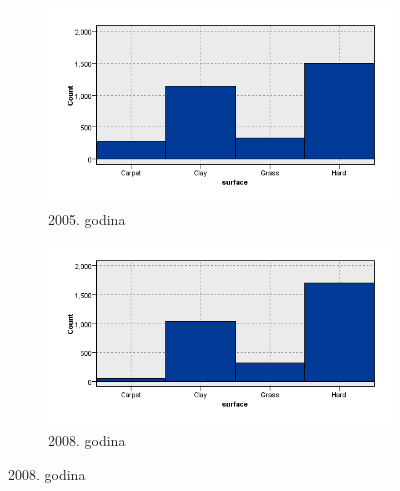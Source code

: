 \documentclass[a4paper]{article}
\begin{document}
\begin{figure}[H]
	\begin{subfigure}[h]{0.35\textwidth}
		\begin{center}
			\includegraphics[scale=0.30]{Klasifikacija/HistogramiPodlogaTerena/Graphboard2005.png}
		\end{center}
		\caption{2005. godina}
		\label{fig:Podloga2005}
	\end{subfigure}
	\hspace{1.5cm}
	\begin{subfigure}[h]{0.35\textwidth}
		\begin{center}
			\includegraphics[scale=0.30]{Klasifikacija/HistogramiPodlogaTerena/Graphboard2008.png}
		\end{center}
		\caption{2008. godina}
		\label{fig:Podloga2008}
	\end{subfigure}


\end{figure}
\end{document}
